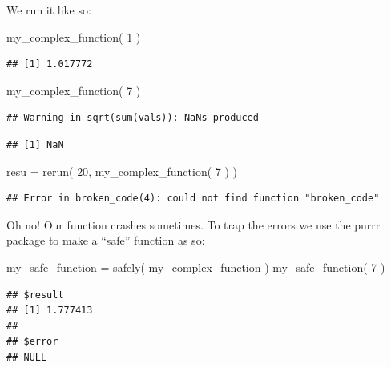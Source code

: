 \documentclass[
]{book}
\newenvironment{Shaded}{\begin{snugshade}}{\end{snugshade}}
\newcommand{\DecValTok}[1]{\textcolor[rgb]{0.00,0.00,0.81}{#1}}
\newcommand{\FunctionTok}[1]{\textcolor[rgb]{0.00,0.00,0.00}{#1}}
\newcommand{\NormalTok}[1]{#1}
\newcommand{\OtherTok}[1]{\textcolor[rgb]{0.56,0.35,0.01}{#1}}
\begin{document}
We run it like so:

\begin{Shaded}
\begin{Highlighting}[]
\FunctionTok{my\_complex\_function}\NormalTok{( }\DecValTok{1}\NormalTok{ )}
\end{Highlighting}
\end{Shaded}

\begin{verbatim}
## [1] 1.017772
\end{verbatim}

\begin{Shaded}
\begin{Highlighting}[]
\FunctionTok{my\_complex\_function}\NormalTok{( }\DecValTok{7}\NormalTok{ )}
\end{Highlighting}
\end{Shaded}

\begin{verbatim}
## Warning in sqrt(sum(vals)): NaNs produced
\end{verbatim}

\begin{verbatim}
## [1] NaN
\end{verbatim}

\begin{Shaded}
\begin{Highlighting}[]
\NormalTok{resu }\OtherTok{=} \FunctionTok{rerun}\NormalTok{( }\DecValTok{20}\NormalTok{, }\FunctionTok{my\_complex\_function}\NormalTok{( }\DecValTok{7}\NormalTok{ ) )}
\end{Highlighting}
\end{Shaded}

\begin{verbatim}
## Error in broken_code(4): could not find function "broken_code"
\end{verbatim}

Oh no! Our function crashes sometimes.
To trap the errors we use the purrr package to make a ``safe'' function as so:

\begin{Shaded}
\begin{Highlighting}[]
\NormalTok{my\_safe\_function }\OtherTok{=} \FunctionTok{safely}\NormalTok{( my\_complex\_function )}
\FunctionTok{my\_safe\_function}\NormalTok{( }\DecValTok{7}\NormalTok{ )}
\end{Highlighting}
\end{Shaded}

\begin{verbatim}
## $result
## [1] 1.777413
## 
## $error
## NULL
\end{verbatim}
\end{document}
